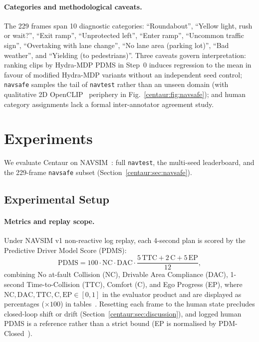\paragraph{Categories and methodological caveats.} The 229 frames span 10 diagnostic categories: ``Roundabout'', ``Yellow light, rush or wait?'', ``Exit ramp'', ``Unprotected left'', ``Enter ramp'', ``Uncommon traffic sign'', ``Overtaking with lane change'', ``No lane area (\eg parking lot)'', ``Bad weather'', and ``Yielding (\eg to pedestrians)''. Three caveats govern interpretation: ranking clips by Hydra-MDP PDMS in Step~0 induces regression to the mean in favour of modified Hydra-MDP variants without an independent seed control; \texttt{navsafe} samples the tail of \texttt{navtest} rather than an unseen domain (with qualitative 2D OpenCLIP~\cite{ilharco2021openclip} periphery in Fig.~\ref{centaur:fig:navsafe}); and human category assignments lack a formal inter-annotator agreement study.

\section{Experiments}\label{centaur:sec:exp}

We evaluate Centaur on NAVSIM~\cite{dauner2024navsim}: full \texttt{navtest}, the multi-seed leaderboard, and the 229-frame \texttt{navsafe} subset (Section~\ref{centaur:sec:navsafe}).

\subsection{Experimental Setup}\label{centaur:sec:setup}

\paragraph{Metrics and replay scope.} Under NAVSIM v1 non-reactive log replay, each 4-second plan is scored by the Predictive Driver Model Score (PDMS):
\begin{equation}
  \label{centaur:eq:pdms}
  \mathrm{PDMS} = 100 \cdot \mathrm{NC} \cdot \mathrm{DAC} \cdot \frac{5\,\mathrm{TTC} + 2\,\mathrm{C} + 5\,\mathrm{EP}}{12},
\end{equation}
combining No at-fault Collision (NC), Drivable Area Compliance (DAC), 1-second Time-to-Collision (TTC), Comfort (C), and Ego Progress (EP), where $\mathrm{NC}, \mathrm{DAC}, \mathrm{TTC}, \mathrm{C}, \mathrm{EP} \in [0,1]$ in the evaluator product and are displayed as percentages ($\times 100$) in tables~\cite{dauner2024navsim}. Resetting each frame to the human state precludes closed-loop shift or drift (Section~\ref{centaur:sec:discussion}), and logged human PDMS is a reference rather than a strict bound (EP is normalised by PDM-Closed~\cite{dauner2023parting}).

